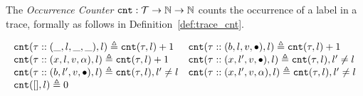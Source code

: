 The \emph{Occurrence Counter} $\mathtt{cnt} : \mathcal{T} \to \mathbb{N} \to \mathbb{N}$ counts the 
occurrence of a label in a trace,
formally as follows in Definition~\ref{def:trace_cnt}.
  \begin{defn}
    \label{def:trace_cnt}
    \[
      \begin{array}{ll}
      \mathtt{cnt}(\mathtt{\tau} :: (\_, l, \_, \_), l ) \triangleq \mathtt{cnt}(\mathtt{\tau}, l) + 1
      &
      \mathtt{cnt}(\mathtt{\tau}  ::(b, l, v, \bullet), l) \triangleq \mathtt{cnt}(\mathtt{\tau}, l) + 1
      \\
      \mathtt{cnt}(\mathtt{\tau}  :: (x, l, v, \alpha), l) \triangleq \mathtt{cnt}(\mathtt{\tau}, l) + 1
      &
      \mathtt{cnt}(\mathtt{\tau}  :: (x, l', v, \bullet), l) \triangleq \mathtt{cnt}(\mathtt{\tau}, l), l' \neq l
      \\
      \mathtt{cnt}(\mathtt{\tau}  :: (b, l', v, \bullet), l) \triangleq \mathtt{cnt}(\mathtt{\tau}, l), l' \neq l
      &
      \mathtt{cnt}(\mathtt{\tau}  :: (x, l', v, \alpha), l) \triangleq \mathtt{cnt}(\mathtt{\tau}, l), l' \neq l
      \\
      \mathtt{cnt}({[]}, l) \triangleq 0
      \end{array}
      \]
\end{defn}
